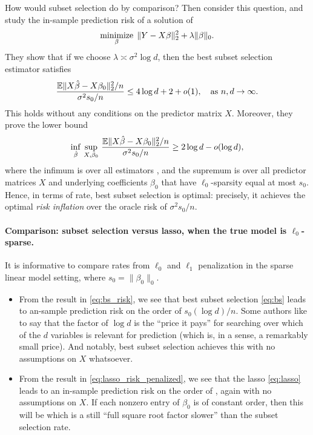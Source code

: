 \documentclass{article}
\begin{document}
How would subset selection do by comparison? Then \citet{foster1994risk}
consider this question, and study the in-sample prediction risk of a solution
\smash{$\hbeta$} of  
\begin{equation}
\label{eq:bs}
\mathop{\mathrm{minimize}}_\beta \; \|Y - X\beta\|_2^2 + \lambda \|\beta\|_0.
\end{equation}
They show that if we choose $\lambda \asymp \sigma^2\log d$, then the best
subset selection estimator satisfies 
\begin{equation}
\label{eq:bs_risk}
\frac{\mathbb{E}\|X\hat{\beta} - X\beta_0\|_2^2/n}{\sigma^2 s_0/n}  
\leq 4\log d + 2 + o(1), \quad \text{as $n,d \to \infty$}.
\end{equation}
This holds without any conditions on the predictor matrix $X$.  Moreover, they
prove the lower bound  
\[
\inf_{\hat{\beta}} \, \sup_{X,\beta_0} \,
\frac{\mathbb{E}\|X\hat{\beta}-X\beta_0\|_2^2/n}{\sigma^2 s_0/n} 
\geq 2 \log d - o(\log d),  
\]
where the infimum is over all estimators \smash{$\hbeta$}, and the supremum is  
over all predictor matrices $X$ and underlying coefficients $\beta_0$ that have
$\ell_0$-sparsity equal at most $s_0$. Hence, in terms of rate, best subset
selection is optimal: precisely, it achieves the optimal \emph{risk inflation}
over the oracle risk of $\sigma^2 s_0/n$. 

\paragraph{Comparison: subset selection versus lasso, when the true model is 
  $\ell_0$-sparse.}     

It is informative to compare rates from $\ell_0$ and $\ell_1$ penalization in
the sparse linear model setting, where $s_0 = \|\beta_0\|_0$. 

\begin{itemize}
\item From the result in \eqref{eq:bs_risk}, we see that best subset selection
  \eqref{eq:bs} leads to an-sample prediction risk on the order of $s_0 (\log
  d)/n$. Some authors like to say that the factor of $\log d$ is the ``price it
  pays'' for searching over which of the $d$ variables is relevant for
  prediction (which is, in a sense, a remarkably small price). And notably, best 
  subset selection achieves this with no assumptions on $X$ whatsoever.     

\item From the result in \eqref{eq:lasso_risk_penalized}, we see that the lasso 
  \eqref{eq:lasso} leads to an in-sample prediction risk on the order of
  , again with no assumptions on
  $X$. If each nonzero entry of $\beta_0$ is of constant order, then this will
  be  which is a still ``full square root factor
  slower'' than the subset selection rate.   
\end{itemize}
\end{document}
